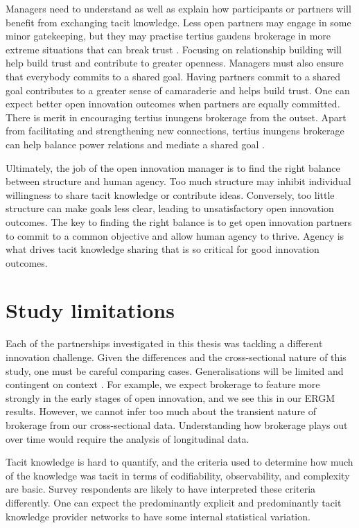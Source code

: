 Managers need to understand as well as explain how participants or partners will benefit from exchanging tacit knowledge. Less open partners may engage in some minor gatekeeping, but they may practise tertius gaudens brokerage in more extreme situations that can break trust \citep{obstfeld2014brokerage}. Focusing on relationship building will help build trust and contribute to greater openness. Managers must also ensure that everybody commits to a shared goal. Having partners commit to a shared goal contributes to a greater sense of camaraderie and helps build trust. One can expect better open innovation outcomes when partners are equally committed. There is merit in encouraging tertius inungens brokerage from the outset. Apart from facilitating and strengthening new connections, tertius inungens brokerage can help balance power relations and mediate a shared goal \citep{chesbrough2012open}.\medskip

Ultimately, the job of the open innovation manager is to find the right balance between structure and human agency. Too much structure may inhibit individual willingness to share tacit knowledge or contribute ideas. Conversely, too little structure can make goals less clear, leading to unsatisfactory open innovation outcomes. The key to finding the right balance is to get open innovation partners to commit to a common objective and allow human agency to thrive. Agency is what drives tacit knowledge sharing that is so critical for good innovation outcomes.

 \section{Study limitations}

Each of the partnerships investigated in this thesis was tackling a different innovation challenge. Given the differences and the cross-sectional nature of this study, one must be careful comparing cases. Generalisations will be limited and contingent on context \citep{welch2011theorising}. For example, we expect brokerage to feature more strongly in the early stages of open innovation, and we see this in our ERGM results. However, we cannot infer too much about the transient nature of brokerage from our cross-sectional data. Understanding how brokerage plays out over time would require the analysis of longitudinal data. \medskip

Tacit knowledge is hard to quantify, and the criteria used to determine how much of the knowledge was tacit in terms of codifiability, observability, and complexity are basic. Survey respondents are likely to have interpreted these criteria differently. One can expect the predominantly explicit and predominantly tacit knowledge provider networks to have some internal statistical variation. \medskip

